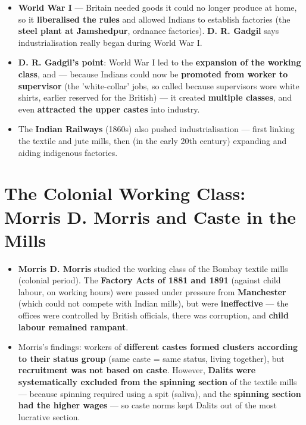 \begin{KeyConcept}
\begin{itemize}
\item \textbf{World War I} --- Britain needed goods it could no longer produce at home, so it \textbf{liberalised the rules} and allowed Indians to establish factories (the \textbf{steel plant at Jamshedpur}, ordnance factories). \textbf{D. R. Gadgil} says industrialisation really began during World War I.
\item \textbf{D. R. Gadgil's point}: World War I led to the \textbf{expansion of the working class}, and --- because Indians could now be \textbf{promoted from worker to supervisor} (the 'white-collar' jobs, so called because supervisors wore white shirts, earlier reserved for the British) --- it created \textbf{multiple classes}, and even \textbf{attracted the upper castes} into industry.
\item The \textbf{Indian Railways} (1860s) also pushed industrialisation --- first linking the textile and jute mills, then (in the early 20th century) expanding and aiding indigenous factories.
\end{itemize}
\end{KeyConcept}

\section{The Colonial Working Class: Morris D. Morris and Caste in the Mills}

\begin{KeyConcept}
\begin{itemize}
\item \textbf{Morris D. Morris} studied the working class of the Bombay textile mills (colonial period). The \textbf{Factory Acts of 1881 and 1891} (against child labour, on working hours) were passed under pressure from \textbf{Manchester} (which could not compete with Indian mills), but were \textbf{ineffective} --- the offices were controlled by British officials, there was corruption, and \textbf{child labour remained rampant}.
\item Morris's findings: workers of \textbf{different castes formed clusters according to their status group} (same caste = same status, living together), but \textbf{recruitment was not based on caste}. However, \textbf{Dalits were systematically excluded from the spinning section} of the textile mills --- because spinning required using a spit (saliva), and the \textbf{spinning section had the higher wages} --- so caste norms kept Dalits out of the most lucrative section.
\end{itemize}
\end{KeyConcept}

